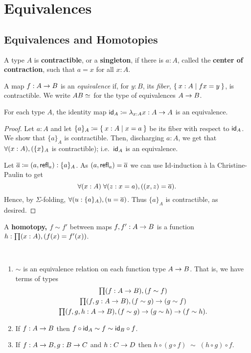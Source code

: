 \chapter{Equivalences}
\label{cha:equivalences}

\section{Equivalences and Homotopies}

\begin{defn}\label{defn:contractible}
  A type $A$ is \textbf{contractible}, or a \textbf{singleton}, if there is $a:A$, called the \textbf{center of contraction}, such that $a=x$ for all $x:A$.
\end{defn}

\begin{defn}\label{defn:equivalence}
  A map $f:A\ra B$ is an {\em equivalence} if, for $y:B$, its {\em fiber}, $\setof{x:A | fx = y}$, is contractible.
  We write $A\eqv B$ for the type of equivalences $A\ra B$.
\end{defn}


\begin{lem}\label{lem:id-map}
  For each type $A$, the identity map $\idfunc[A]\defeq \lambda_{x:A}x :A\ra A$ is an equivalence.
\end{lem}
\begin{proof}
  Let $a:A$ and let $\{a\}_A\defeq \setof{ x:A | x=a }$ be its fiber with respect to $\idfunc[A]$.
  We show that $\{ a\}_A$ is contractible.
  Then, discharging $a:A$, we get that $\fall{x:A} (\{ x\}_A$ is contractible); i.e.\ $\idfunc[A]$ is an equivalence.

  Let $\oa \defeq (a,\refl{a}):\{ a\}_A$.  As $(a,\refl{a}) = \oa$ we can use Id-induction \`{a} la Christine-Paulin to get
  \[\fall{x:A}{z:x=a} ((x,z)=\oa).\]
  Hence, by $\Sigma$-folding, $\fall{u:\{ a\}_A} (u=\oa)$.
  Thus $\{ a\}_A$ is contractible, as desired.
\end{proof}

\begin{defn}\label{defn:homotopy-between-functions}
  A \textbf{homotopy, $f\sim f'$} between maps $f,f':A\ra B$ is a function $h:\prd{x:A} (f(x)=f'(x))$.
\end{defn}

\begin{lem}\label{lem:homotopy-props}\ 
\begin{enumerate}
\item $\sim$ is an equivalence relation on each function type $A\ra B$.
  That is, we have terms of types
  \begin{gather*}
    \prd{f:A\to B} (f\sim f)\\
    \prd{f,g:A\to B} (f\sim g) \to (g\sim f)\\
    \prd{f,g,h:A\to B} (f\sim g) \to (g\sim h) \to (f\sim h).
  \end{gather*}
\item If $f:A\ra B$ then $f\circ \idfunc[A]\sim f\sim \idfunc[B]\circ f$.
\item If $f:A\ra B, g:B\ra C$ and $h:C\ra D$ then $h\circ (g\circ f)\;\sim\; (h\circ g)\circ f$.
\end{enumerate}
\end{lem}

